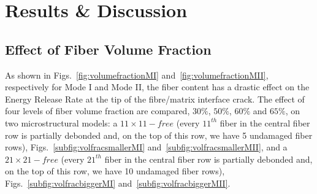 \documentclass[review]{elsarticle}
\begin{document}

\section{Results \& Discussion}

\subsection{Effect of Fiber Volume Fraction}\label{subsec:volfrac}

As shown in Figs.~\ref{fig:volumefractionMI} and~\ref{fig:volumefractionMII}, respectively for Mode I and Mode II, the fiber content has a drastic effect on the Energy Release Rate at the tip of the fibre/matrix interface crack. The effect of four levels of fiber volume fraction are compared, $30\%$, $50\%$, $60\%$ and $65\%$, on two microstructural models: a $11\times 11-free$ (every $11^{th}$ fiber in the central fiber row is partially debonded and, on the top of this row, we have 5 undamaged fiber rows), Figs.~\ref{subfig:volfracsmallerMI} and~\ref{subfig:volfracsmallerMII}, and a $21\times 21-free$ (every $21^{th}$ fiber in the central fiber row is partially debonded and, on the top of this row, we have 10 undamaged fiber rows), Figs.~\ref{subfig:volfracbiggerMI} and~\ref{subfig:volfracbiggerMII}.
\end{document}
